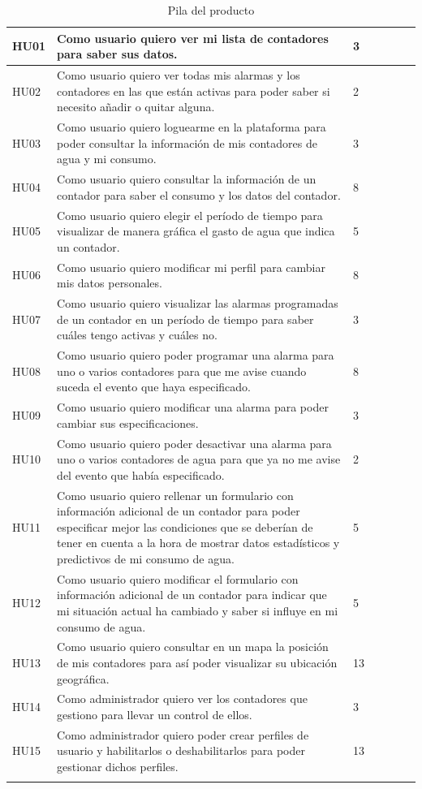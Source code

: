 \documentclass[pdftex,11pt,a4paper]{book}
\begin{document}
\begin{center}
\begin{longtable}{|>{\centering\arraybackslash}X m{}|m{}|>{\centering\arraybackslash}X m{}|>{\centering\arraybackslash}X m{}|}
HU01 & Como usuario quiero ver mi lista de contadores para saber sus datos. & 3 & 1 \\ \hline
HU02 & Como usuario quiero ver todas mis alarmas y los contadores en las que están activas para poder saber si necesito añadir o quitar alguna. & 2 & 9 \\ \hline
HU03 & Como usuario quiero loguearme en la plataforma para poder consultar la información de mis contadores de agua y mi consumo. & 3 & 2 \\ \hline
HU04 & Como usuario quiero consultar la información de un contador para saber el consumo y los datos del contador. & 8 & 3 \\ \hline
HU05 & Como usuario quiero elegir el período de tiempo para visualizar de manera gráfica el gasto de agua que indica un contador. & 5 & 4 \\ \hline
HU06 & Como usuario quiero modificar mi perfil para cambiar mis datos personales. & 8 & 5 \\ \hline
HU07 & Como usuario quiero visualizar las alarmas programadas de un contador en un período de tiempo para saber cuáles tengo activas y cuáles no. & 3 & 6 \\ \hline
HU08 & Como usuario quiero poder programar una alarma para uno o varios contadores para que me avise cuando suceda el evento que haya especificado. & 8 & 7 \\ \hline
HU09 & Como usuario quiero modificar una alarma para poder cambiar sus especificaciones. & 3 & 10 \\ \hline
HU10 & Como usuario quiero poder desactivar una alarma para uno o varios contadores de agua para que ya no me avise del evento que había especificado. & 2 & 8 \\ \hline
HU11 & Como usuario quiero rellenar un formulario con información adicional de un contador para poder especificar mejor las condiciones que se deberían de tener en cuenta a la hora de mostrar datos estadísticos y predictivos de mi consumo de agua. & 5 & 11 \\ \hline
HU12 & Como usuario quiero modificar el formulario con información adicional de un contador para indicar que mi situación actual ha cambiado y saber si influye en mi consumo de agua. & 5 & 12 \\ \hline
HU13 & Como usuario quiero consultar en un mapa la posición de mis contadores para así poder visualizar su ubicación geográfica. & 13 & 13 \\ \hline
HU14 & Como administrador quiero ver los contadores que gestiono para llevar un control de ellos. & 3 & 15 \\ \hline
HU15 & Como administrador quiero poder crear perfiles de usuario y habilitarlos o deshabilitarlos para poder gestionar dichos perfiles. & 13 & 14 \\ \hline
\caption{Pila del producto} \label{tablalarga:tablaHU}
\end{longtable}
\end{center}
\end{document}
